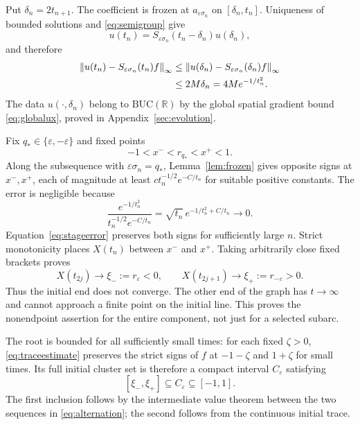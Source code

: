 \documentclass[11pt,reqno]{amsart}
\numberwithin{equation}{section}
\theoremstyle{definition}
\theoremstyle{remark}
\newcommand{\R}{\mathbb R}
\newcommand{\BUC}{\mathrm{BUC}}
\newcommand{\norm}[1]{\left\lVert#1\right\rVert}
\begin{document}
Put $\delta_n=2t_{n+1}$. The coefficient is frozen at $a_{\varepsilon\sigma_n}$ on $[\delta_n,t_n]$. Uniqueness of bounded solutions and \eqref{eq:semigroup} give
\[
 u(t_n)=S_{\varepsilon\sigma_n}(t_n-\delta_n)u(\delta_n),
\]
and therefore
\begin{align}
 \norm{u(t_n)-S_{\varepsilon\sigma_n}(t_n)f}_\infty
 &\leq\norm{u(\delta_n)-S_{\varepsilon\sigma_n}(\delta_n)f}_\infty\notag\\
 &\leq2M\delta_n=4M e^{-1/t_n^2}.
 \label{eq:stageerror}
\end{align}
The data $u(\cdot,\delta_n)$ belong to $\BUC(\R)$ by the global
spatial gradient bound \eqref{eq:globalux}, proved in
Appendix~\ref{sec:evolution}.

Fix $q_*\in\{\varepsilon,-\varepsilon\}$ and fixed points
\[
 -1<x^-<r_{q_*}<x^+<1.
\]
Along the subsequence with $\varepsilon\sigma_n=q_*$, Lemma~\ref{lem:frozen} gives opposite signs at $x^-,x^+$, each of magnitude at least $c t_n^{-1/2}e^{-C/t_n}$ for suitable positive constants. The error is negligible because
\[
 \frac{e^{-1/t_n^2}}{t_n^{-1/2}e^{-C/t_n}}
 =\sqrt{t_n}\,e^{-1/t_n^2+C/t_n}\longrightarrow0.
\]
Equation~\eqref{eq:stageerror} preserves both signs for sufficiently large $n$. Strict monotonicity places $X(t_n)$ between $x^-$ and $x^+$. Taking arbitrarily close fixed brackets proves
\begin{equation}\label{eq:alternation}
 X(t_{2j})\longrightarrow \xi_-:=r_\varepsilon<0,
 \qquad
 X(t_{2j+1})\longrightarrow \xi_+:=r_{-\varepsilon}>0.
\end{equation}
Thus the initial end does not converge. The other end of the graph has $t\to\infty$ and cannot approach a finite point on the initial line. This proves the nonendpoint assertion for the entire component, not just for a selected subarc.

The root is bounded for all sufficiently small times: for each fixed $\zeta>0$, \eqref{eq:traceestimate} preserves the strict signs of $f$ at $-1-\zeta$ and $1+\zeta$ for small times. Its full initial cluster set is therefore a compact interval $C_\varepsilon$ satisfying
\begin{equation}\label{eq:countercluster}
 [\xi_-,\xi_+]\subseteq C_\varepsilon\subseteq[-1,1].
\end{equation}
The first inclusion follows by the intermediate value theorem between the two sequences in \eqref{eq:alternation}; the second follows from the continuous initial trace. 
\end{document}
